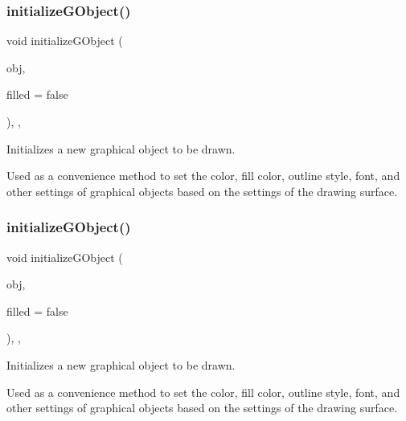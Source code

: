 \subsubsection{\texorpdfstring{initialize\+G\+Object()}{initializeGObject()}\hspace{0.1cm}{\footnotesize\ttfamily [1/2]}}
{\footnotesize\ttfamily void initialize\+G\+Object (\begin{DoxyParamCaption}\item[{\mbox{\hyperlink{classGObject}{G\+Object}} \&}]{obj,  }\item[{bool}]{filled = {\ttfamily false} }\end{DoxyParamCaption})\hspace{0.3cm}{\ttfamily [protected]}, {\ttfamily [virtual]}, {\ttfamily [inherited]}}



Initializes a new graphical object to be drawn. 

Used as a convenience method to set the color, fill color, outline style, font, and other settings of graphical objects based on the settings of the drawing surface. \mbox{\label{classGDrawingSurface_a43e6bc951980da061ddc40407daee227}} 
\subsubsection{\texorpdfstring{initialize\+G\+Object()}{initializeGObject()}\hspace{0.1cm}{\footnotesize\ttfamily [2/2]}}
{\footnotesize\ttfamily void initialize\+G\+Object (\begin{DoxyParamCaption}\item[{\mbox{\hyperlink{classGObject}{G\+Object}} $\ast$}]{obj,  }\item[{bool}]{filled = {\ttfamily false} }\end{DoxyParamCaption})\hspace{0.3cm}{\ttfamily [protected]}, {\ttfamily [virtual]}, {\ttfamily [inherited]}}



Initializes a new graphical object to be drawn. 

Used as a convenience method to set the color, fill color, outline style, font, and other settings of graphical objects based on the settings of the drawing surface. \mbox{\label{classGObservable_aeec1adc19aa0f33de62390686ee1382c}} 
